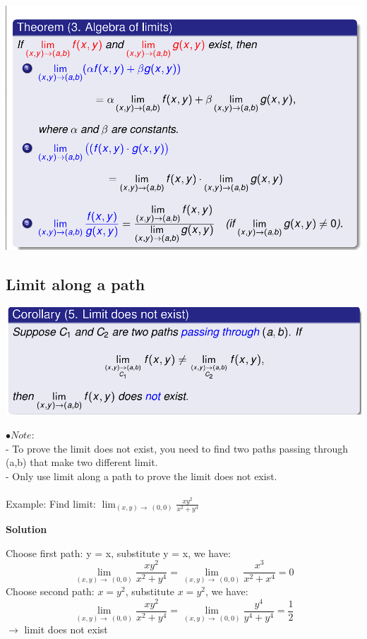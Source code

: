 \documentclass[12pt]{article}
\begin{document}
\begin{center}
    \includegraphics[scale = 0.5]{5.png}\\
\end{center}


\subsection{Limit along a path}
\begin{center}
    \includegraphics[scale= 0.5 ]{6.png} \\
\end{center}


$\bullet Note:$\\
- To prove the limit does not exist, you need to find two paths passing through (a,b) that make two different limit.\\
- Only use limit along a path to prove the limit does not exist. \\
\\
Example: Find limit: $\lim_{(x,y) \to \ (0,0)} \frac{xy^2}{x^2 + y^4} $

\begin{center}
    \textbf{Solution}
\end{center}
Choose first path: y = x, substitute y = x, we have:
$$\lim_{(x,y) \to \ (0,0)} \frac{xy^2}{x^2 + y^4} =  \lim_{(x,y) \to \ (0,0)} \frac{x^3}{x^2 + x^4} = 0 $$ 
Choose second path: $x = y^2$, substitute $x = y^2$, we have:
$$\lim_{(x,y) \to \ (0,0)} \frac{xy^2}{x^2 + y^4} =  \lim_{(x,y) \to \ (0,0)} \frac{y^4}{y^4 + y^4} = \frac{1}{2} $$ 
$\rightarrow$ limit does not exist 
\end{document}

